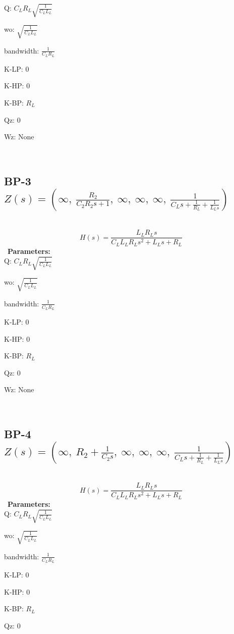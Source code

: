 \documentclass{article}
\begin{document}
Q: $C_{L} R_{L} \sqrt{\frac{1}{C_{L} L_{L}}}$\ 

wo: $\sqrt{\frac{1}{C_{L} L_{L}}}$\ 

bandwidth: $\frac{1}{C_{L} R_{L}}$\ 

K-LP: $0$\ 

K-HP: $0$\ 

K-BP: $R_{L}$\ 

Qz: $0$\ 

Wz: $\text{None}$\ 

\ 

\subsection{BP-3 $Z(s) = \left( \infty, \  \frac{R_{2}}{C_{2} R_{2} s + 1}, \  \infty, \  \infty, \  \infty, \  \frac{1}{C_{L} s + \frac{1}{R_{L}} + \frac{1}{L_{L} s}}\right)$ } \ 
\textbf{\[H(s) = \frac{L_{L} R_{L} s}{C_{L} L_{L} R_{L} s^{2} + L_{L} s + R_{L}}\] } \ 
\textbf{Parameters:}\\ 

Q: $C_{L} R_{L} \sqrt{\frac{1}{C_{L} L_{L}}}$\ 

wo: $\sqrt{\frac{1}{C_{L} L_{L}}}$\ 

bandwidth: $\frac{1}{C_{L} R_{L}}$\ 

K-LP: $0$\ 

K-HP: $0$\ 

K-BP: $R_{L}$\ 

Qz: $0$\ 

Wz: $\text{None}$\ 

\ 

\subsection{BP-4 $Z(s) = \left( \infty, \  R_{2} + \frac{1}{C_{2} s}, \  \infty, \  \infty, \  \infty, \  \frac{1}{C_{L} s + \frac{1}{R_{L}} + \frac{1}{L_{L} s}}\right)$ } \ 
\textbf{\[H(s) = \frac{L_{L} R_{L} s}{C_{L} L_{L} R_{L} s^{2} + L_{L} s + R_{L}}\] } \ 
\textbf{Parameters:}\\ 

Q: $C_{L} R_{L} \sqrt{\frac{1}{C_{L} L_{L}}}$\ 

wo: $\sqrt{\frac{1}{C_{L} L_{L}}}$\ 

bandwidth: $\frac{1}{C_{L} R_{L}}$\ 

K-LP: $0$\ 

K-HP: $0$\ 

K-BP: $R_{L}$\ 

Qz: $0$\ 
\end{document}
